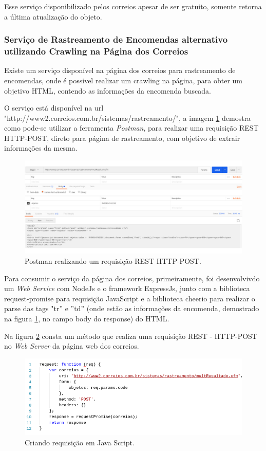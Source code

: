 \documentclass[12pt]{article}
\begin{document}
 Esse serviço disponibilizado pelos correios apesar de ser gratuito, somente retorna a última atualização do objeto.
\subsubsection{Serviço de Rastreamento de Encomendas alternativo utilizando Crawling na Página dos Correios}\label{web:alt}

	Existe um serviço disponível na página dos correios para rastreamento de encomendas, onde é possivel realizar um crawling na página, para obter um objetivo HTML, contendo as informações da encomenda buscada.
	
	O serviço está disponível na url "http://www2.correios.com.br/sistemas/rastreamento/", a imagem \ref{c1} demostra como pode-se utilizar a ferramenta \textit{Postman}, para realizar uma requisição REST HTTP-POST, direto para página de rastreamento, com objetivo de extrair informações da mesma.
	
	 \begin{figure}[H]
	 	\centering
	 	\includegraphics[scale=0.3]{Imagens/c1.jpg}
	 	\caption{Postman realizando um requisição REST HTTP-POST.}
	 	\label{c1}
	 \end{figure}
	
	
	Para consumir o serviço da página dos correios, primeiramente, foi desenvolvivdo um \textit{Web Service} com NodeJs e o framework ExpressJs, junto com a biblioteca request-promise para requisição JavaScript e a biblioteca cheerio para realizar o parse das tags "tr'' e ''td'' (onde estão as informações da encomenda, demostrado na figura  \ref{c1}, no campo body do response) do HTML.
	
	Na figura \ref{c3} consta um método que realiza uma requisição REST - HTTP-POST no \textit{Web Server} da página web dos correios.
		 \begin{figure}[H]
		\centering
		\includegraphics[scale=0.55]{Imagens/req.png}
		\caption{Criando requisição em Java Script.}
		\label{c3}
	\end{figure}
\end{document}
